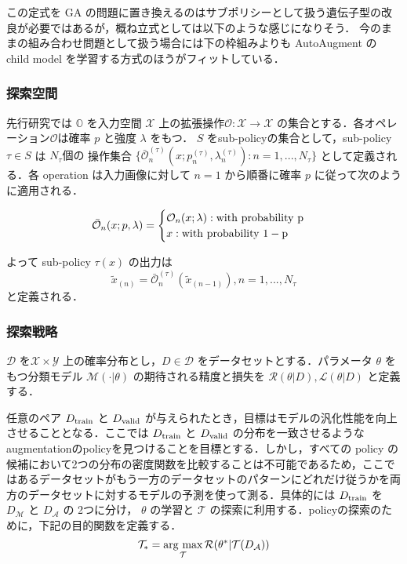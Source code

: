\documentclass[onecolumn]{ujarticle}   %
\newcommand{\argmax}{\mathop{\rm arg~max}\limits}
\begin{document}
	この定式を GA の問題に置き換えるのはサブポリシーとして扱う遺伝子型の改良が必要ではあるが，概ね立式としては以下のような感じになりそう．
	今のままの組み合わせ問題として扱う場合には下の枠組みよりも AutoAugment の child model を学習する方式のほうがフィットしている．
	\subsubsection{探索空間}
	先行研究では $\mathbb{O}$ を入力空間 $\mathcal{X}$ 上の拡張操作$\mathcal{O}:\mathcal{X} \to \mathcal{X}$ の集合とする．各オペレーション$\mathcal{O}$は確率 $p$ と強度 $\lambda$ をもつ．
	$S$ をsub-policyの集合として，sub-policy $\tau \in S$ は $N_{\tau}個の$ 操作集合 $\{\bar{\mathcal{O}}^{(\tau)}_{n}(x;p^{(\tau)}_{n}, \lambda^{(\tau)}_{n}):n=1,...,N_{\tau}\}$ として定義される．各 operation は入力画像に対して $n=1$ から順番に確率 $p$ に従って次のように適用される．

	\begin{eqnarray*}
		\bar{\mathcal{O}}_{n}(x;p, \lambda) =
		\begin{cases}
			\mathcal{O}_{n}(x;\lambda) : \rm{with \ probability} \ p \\
			x : \rm{with \ probability} \ 1-p
		\end{cases}
	\end{eqnarray*}

	よって sub-policy $\tau(x)$ の出力は
	\begin{equation*}
		\tilde{x}_{(n)} = \bar{\mathcal{O}}^{(\tau)}_{n}(\tilde{x}_{(n-1)}), n = 1, ..., N_{\tau}
	\end{equation*}
	と定義される．

	\subsubsection{探索戦略}
	$\mathcal{D}$ を$\mathcal{X} \times \mathcal{Y}$ 上の確率分布とし，$D \in \mathcal{D}$ をデータセットとする．パラメータ $\theta$ をもつ分類モデル $\mathcal{M}(\cdot | \theta)$ の期待される精度と損失を $\mathcal{R}(\theta|D), \mathcal{L}(\theta|D)$ と定義する．

	任意のペア $D_{\rm{train}}$ と $D_{\rm{valid}}$ が与えられたとき，目標はモデルの汎化性能を向上させることとなる．ここでは $D_{\rm{train}}$ と $D_{\rm{valid}}$ の分布を一致させるようなaugmentationのpolicyを見つけることを目標とする．しかし，すべての policy の候補において2つの分布の密度関数を比較することは不可能であるため，ここではあるデータセットがもう一方のデータセットのパターンにどれだけ従うかを両方のデータセットに対するモデルの予測を使って測る．具体的には $D_{\rm{train}}$ を $D_{\mathcal{M}}$ と $D_{\mathcal{A}}$ の 2つに分け， $\theta$ の学習と $\mathcal{T}$ の探索に利用する．policyの探索のために，下記の目的関数を定義する．
	\begin{equation*}
		\mathcal{T}_{*} = \argmax_{\mathcal{T}} \mathcal{R}(\theta^{*}|\mathcal{T}(D_{\mathcal{A}}))
	\end{equation*}
\end{document}
